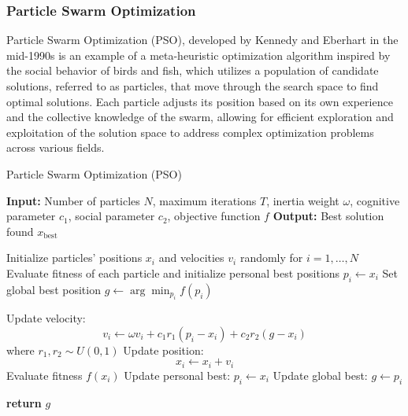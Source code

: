 \documentclass{article}[12pt]
\begin{document}
\subsubsection*{Particle Swarm Optimization}
Particle Swarm Optimization (PSO), developed by Kennedy and Eberhart in the mid-1990s \cite{PSO1995} is an example of a meta-heuristic optimization algorithm inspired by the social behavior of birds and fish, which utilizes a population of candidate solutions, referred to as particles, that move through the search space to find optimal solutions. 
Each particle adjusts its position based on its own experience and the collective knowledge of the swarm, allowing for efficient exploration and exploitation of the solution space to address complex optimization problems across various fields.

\begin{algorithm}[H]
\caption{Particle Swarm Optimization (PSO)}
\begin{algorithmic}[1]
\State \textbf{Input:} Number of particles $N$, maximum iterations $T$, inertia weight $\omega$, cognitive parameter $c_1$, social parameter $c_2$, objective function $f$
\State \textbf{Output:} Best solution found $x_\text{best}$

\State Initialize particles' positions $x_i$ and velocities $v_i$ randomly for $i = 1, \dots, N$
\State Evaluate fitness of each particle and initialize personal best positions $p_i \gets x_i$
\State Set global best position $g \gets \arg\min_{p_i} f(p_i)$

        \State Update velocity: 
        \[
        v_i \gets \omega v_i + c_1 r_1 (p_i - x_i) + c_2 r_2 (g - x_i)
        \]
        where $r_1, r_2 \sim U(0, 1)$
        \State Update position: 
        \[
        x_i \gets x_i + v_i
        \]
        \State Evaluate fitness $f(x_i)$
            \State Update personal best: $p_i \gets x_i$
        \EndIf
            \State Update global best: $g \gets p_i$
        \EndIf
    \EndFor
\EndFor

\State \textbf{return} $g$
\end{algorithmic}
\end{algorithm}
\end{document}
